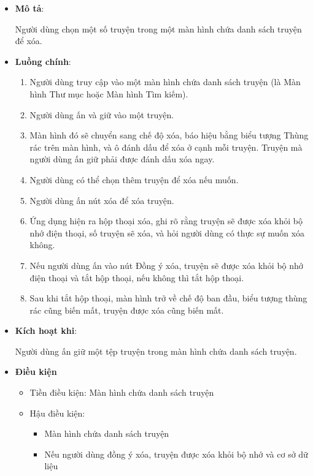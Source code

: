 \documentclass[
]{article}
\begin{document}
\begin{itemize}
\item
  \textbf{Mô tả}:

  Người dùng chọn một số truyện trong một màn hình chứa danh sách truyện
  để xóa.
\item
  \textbf{Luồng chính}:

  \begin{enumerate}
  \def\labelenumi{\arabic{enumi}.}
    \item
    Người dùng truy cập vào một màn hình chứa danh sách truyện (là Màn
    hình Thư mục hoặc Màn hình Tìm kiếm).
  \item
    Người dùng ấn và giữ vào một truyện.
  \item
    Màn hình đó sẽ chuyển sang chế độ xóa, báo hiệu bằng biểu tượng
    Thùng rác trên màn hình, và ô đánh dấu để xóa ở cạnh mỗi truyện.
    Truyện mà người dùng ấn giữ phải được đánh dấu xóa ngay.
  \item
    Người dùng có thể chọn thêm truyện để xóa nếu muốn.
  \item
    Người dùng ấn nút xóa để xóa truyện.
  \item
    Ứng dụng hiện ra hộp thoại xóa, ghi rõ rằng truyện sẽ được xóa khỏi
    bộ nhớ điện thoại, số truyện sẽ xóa, và hỏi người dùng có thực sự
    muốn xóa không.
  \item
    Nếu người dùng ấn vào nút Đồng ý xóa, truyện sẽ được xóa khỏi bộ nhớ
    điện thoại và tắt hộp thoại, nếu không thì tắt hộp thoại.
  \item
    Sau khi tắt hộp thoại, màn hình trở về chế độ ban đầu, biểu tượng
    thùng rác cũng biến mất, truyện được xóa cũng biến mất.
  \end{enumerate}
\item
  \textbf{Kích hoạt khi}:

  Người dùng ấn giữ một tệp truyện trong màn hình chứa danh sách truyện.
\item
  \textbf{Điều kiện}

  \begin{itemize}
  \item
    Tiền điều kiện: Màn hình chứa danh sách truyện
  \item
    Hậu điều kiện:

    \begin{itemize}
        \item
      Màn hình chứa danh sách truyện
    \item
      Nếu người dùng đồng ý xóa, truyện được xóa khỏi bộ nhớ và cơ sở dữ
      liệu
    \end{itemize}
  \end{itemize}
\end{itemize}
\end{document}
